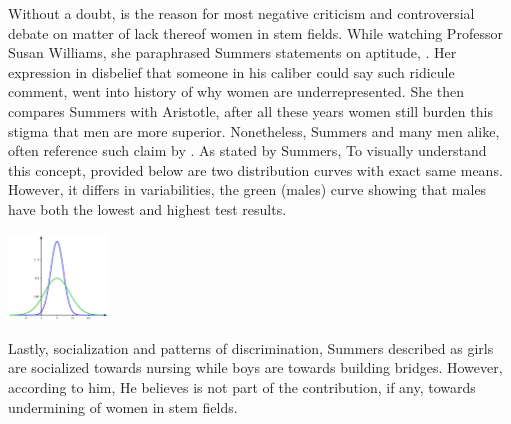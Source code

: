 \par
Without a doubt,  is the reason for most negative 
criticism and controversial debate on matter of lack thereof women in stem fields. While watching
Professor Susan Williams, she paraphrased Summers statements on aptitude, \cite{williams}.
Her expression in disbelief that someone in his caliber could say such ridicule comment, went into
history of why women are underrepresented. She then compares Summers with Aristotle, after all these
years women still burden this stigma that men are more superior. Nonetheless, Summers and many men
alike, often reference such claim by . As stated by Summers,
\cite{summers} To visually understand this
concept, provided below are two distribution curves with exact same means. However, it differs in
variabilities, the green (\textcolor{darkpastelgreen}{males}) curve showing that males have both
the lowest and highest test results.

\begin{center}
  \includegraphics[width=0.2\textwidth]{normaldis.png}
\end{center}

\par
Lastly, socialization and patterns of discrimination, Summers described as girls are socialized
towards nursing while boys are towards building bridges. However, according to him,  He believes  is
not part of the contribution, if any, towards undermining of women in stem fields.

\clearpage